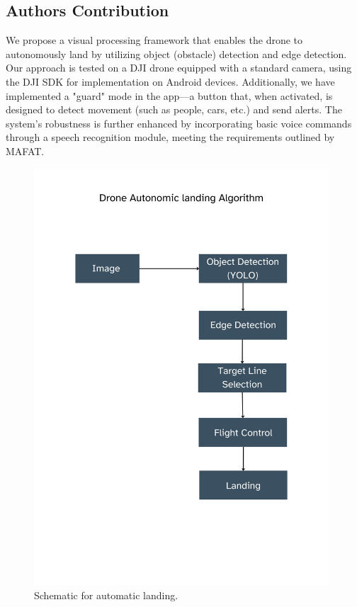 \documentclass[3p,times]{elsarticle}
\begin{document}
\subsection{Authors Contribution}
We propose a visual processing framework that enables the drone to autonomously land by utilizing object (obstacle) detection and edge detection. Our approach is tested on a DJI drone equipped with a standard camera, using the DJI SDK for implementation on Android devices. Additionally, we have implemented a "guard" mode in the app—a button that, when activated, is designed to detect movement (such as people, cars, etc.) and send alerts. The system's robustness is further enhanced by incorporating basic voice commands through a speech recognition module, meeting the requirements outlined by MAFAT.

\begin{figure}[htp]
    \centering
    \includegraphics[width=11.0cm]{Schematic_for_automatic_landing.png}
    \caption{Schematic for automatic landing.}
    \label{fig:Schematic_for_automatic_landing.}
\end{figure}


\end{document}
